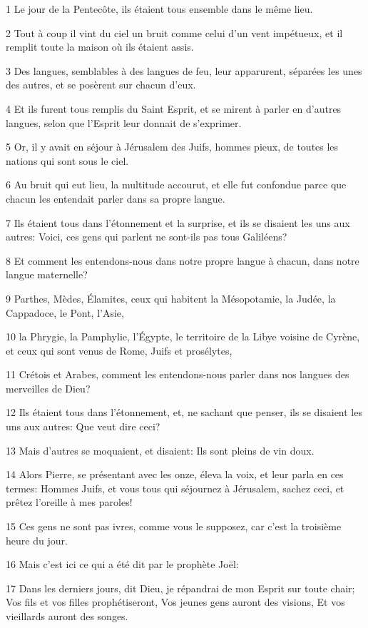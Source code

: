 \par 1 Le jour de la Pentecôte, ils étaient tous ensemble dans le même lieu.
\par 2 Tout à coup il vint du ciel un bruit comme celui d'un vent impétueux, et il remplit toute la maison où ils étaient assis.
\par 3 Des langues, semblables à des langues de feu, leur apparurent, séparées les unes des autres, et se posèrent sur chacun d'eux.
\par 4 Et ils furent tous remplis du Saint Esprit, et se mirent à parler en d'autres langues, selon que l'Esprit leur donnait de s'exprimer.
\par 5 Or, il y avait en séjour à Jérusalem des Juifs, hommes pieux, de toutes les nations qui sont sous le ciel.
\par 6 Au bruit qui eut lieu, la multitude accourut, et elle fut confondue parce que chacun les entendait parler dans sa propre langue.
\par 7 Ils étaient tous dans l'étonnement et la surprise, et ils se disaient les uns aux autres: Voici, ces gens qui parlent ne sont-ils pas tous Galiléens?
\par 8 Et comment les entendons-nous dans notre propre langue à chacun, dans notre langue maternelle?
\par 9 Parthes, Mèdes, Élamites, ceux qui habitent la Mésopotamie, la Judée, la Cappadoce, le Pont, l'Asie,
\par 10 la Phrygie, la Pamphylie, l'Égypte, le territoire de la Libye voisine de Cyrène, et ceux qui sont venus de Rome, Juifs et prosélytes,
\par 11 Crétois et Arabes, comment les entendons-nous parler dans nos langues des merveilles de Dieu?
\par 12 Ils étaient tous dans l'étonnement, et, ne sachant que penser, ils se disaient les uns aux autres: Que veut dire ceci?
\par 13 Mais d'autres se moquaient, et disaient: Ils sont pleins de vin doux.
\par 14 Alors Pierre, se présentant avec les onze, éleva la voix, et leur parla en ces termes: Hommes Juifs, et vous tous qui séjournez à Jérusalem, sachez ceci, et prêtez l'oreille à mes paroles!
\par 15 Ces gens ne sont pas ivres, comme vous le supposez, car c'est la troisième heure du jour.
\par 16 Mais c'est ici ce qui a été dit par le prophète Joël:
\par 17 Dans les derniers jours, dit Dieu, je répandrai de mon Esprit sur toute chair; Vos fils et vos filles prophétiseront, Vos jeunes gens auront des visions, Et vos vieillards auront des songes.
